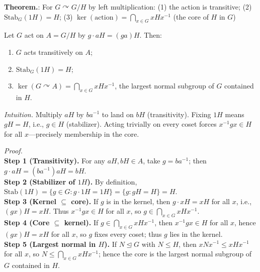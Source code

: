 \documentclass[12pt]{article}
\theoremstyle{definition}
\begin{document}
\newpage


\noindent\textbf{Theorem.}: For $G\curvearrowright G/H$ by left multiplication:
(1) the action is transitive; (2) $\mathrm{Stab}_G(1H)=H$; (3) $\ker(\text{action})=\bigcap_{x\in G} xHx^{-1}$ (the core of $H$ in $G$)

\newpage

Let $G$ act on $A=G/H$ by $g\cdot aH=(ga)H$. Then:
\begin{enumerate}\itemsep0.25em
\item $G$ acts transitively on $A$;
\item $\mathrm{Stab}_G(1H)=H$;
\item $\ker(G\curvearrowright A)=\displaystyle\bigcap_{x\in G}xHx^{-1}$, the largest normal subgroup of $G$ contained in $H$.
\end{enumerate}

\dotfill

\emph{Intuition.} Multiply $aH$ by $ba^{-1}$ to land on $bH$ (transitivity). Fixing $1H$ means $gH=H$, i.e., $g\in H$ (stabilizer). Acting trivially on every coset forces $x^{-1}gx\in H$ for all $x$—precisely membership in the core. 

\dotfill

\emph{Proof.}\\
\textbf{Step 1 (Transitivity).} For any $aH,bH\in A$, take $g=ba^{-1}$; then $g\cdot aH=(ba^{-1})aH=bH$.\\
\textbf{Step 2 (Stabilizer of $1H$).} By definition, $\mathrm{Stab}(1H)=\{g\in G: g\cdot 1H=1H\}=\{g: gH=H\}=H$.\\
\textbf{Step 3 (Kernel $\subseteq$ core).} If $g$ is in the kernel, then $g\cdot xH=xH$ for all $x$, i.e., $(gx)H=xH$. Thus $x^{-1}gx\in H$ for all $x$, so $g\in \bigcap_{x\in G}xHx^{-1}$.\\
\textbf{Step 4 (Core $\subseteq$ kernel).} If $g\in \bigcap_{x\in G}xHx^{-1}$, then $x^{-1}gx\in H$ for all $x$, hence $(gx)H=xH$ for all $x$, so $g$ fixes every coset; thus $g$ lies in the kernel.\\
\textbf{Step 5 (Largest normal in $H$).} If $N\trianglelefteq G$ with $N\le H$, then $xNx^{-1}\le xHx^{-1}$ for all $x$, so $N\le \bigcap_{x\in G}xHx^{-1}$; hence the core is the largest normal subgroup of $G$ contained in $H$.\\

\newpage

\end{document}
